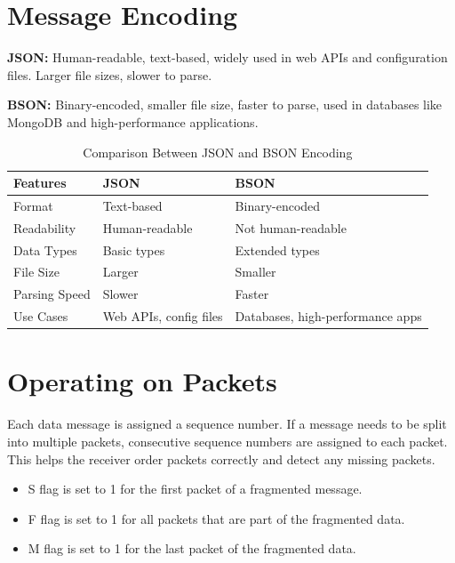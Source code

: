 \documentclass[lettersize,journal]{IEEEtran}
\begin{document}
\section{Message Encoding}
\textbf{JSON:} Human-readable, text-based, widely used in web APIs and configuration files. Larger file sizes, slower to parse.

\textbf{BSON:} Binary-encoded, smaller file size, faster to parse, used in databases like MongoDB and high-performance applications.

\begin{table}[!t]
\centering
\caption{Comparison Between JSON and BSON Encoding}
\label{tab:json_bson}
\begin{tabular}{|l|p{1.5cm}|p{1.5cm}|}
\hline
\textbf{Features} & \textbf{JSON} & \textbf{BSON} \\
\hline
Format & Text-based & Binary-encoded \\
\hline
Readability & Human-readable & Not human-readable \\
\hline
Data Types & Basic types & Extended types \\
\hline
File Size & Larger & Smaller \\
\hline
Parsing Speed & Slower & Faster \\
\hline
Use Cases & Web APIs, config files & Databases, high-performance apps \\
\hline
\end{tabular}
\end{table}




\section{Operating on Packets}
Each data message is assigned a sequence number. If a message needs to be split into multiple packets, consecutive sequence numbers are assigned to each packet. This helps the receiver order packets correctly and detect any missing packets.

\begin{itemize}
    \item S flag is set to 1 for the first packet of a fragmented message.
    \item F flag is set to 1 for all packets that are part of the fragmented data.
    \item M flag is set to 1 for the last packet of the fragmented data.
\end{itemize}
\end{document}
